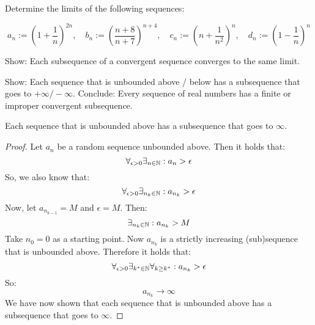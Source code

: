 \documentclass[week=4]{homework}
\date{\today}
\begin{document}
    \maketitle
    \thispagestyle{empty}
    \newpage
    \begin{questions}
		\let\firstquestion\question
		\renewcommand*{\question}{\vspace{7mm}\firstquestion}
        \firstquestion
        Determine the limits of the following sequences:
        
        \[
	        a_n := \left(1 + \frac{1}{n} \right)^{2n}, \quad b_n := \left(\frac{n+8}{n+7} \right)^{n+4}, \quad c_n := \left(n + \frac{1}{n^2} \right)^{n}, \quad d_n := \left(1 - \frac{1}{n} \right)^n
        \]
        
        \question 
        Show: Each subsequence of a convergent sequence converges to the same limit. 
        
        \question 
        Show: Each sequence that is unbounded above / below has a subsequence that goes to $+ \infty / - \infty$. Conclude: Every sequence of real numbers has a finite or improper convergent subsequence. 
        
        \begin{inlinetoprove}
        	Each sequence that is unbounded above has a subsequence that goes to $\infty$.
        \end{inlinetoprove}
        \begin{proof}
        	Let $a_n$ be a random sequence unbounded above. Then it holds that:
        	\[
	        	\forall_{\epsilon > 0} \exists_{n \in \naturals} : a_n > \epsilon
        	\]
	        So, we also know that:
	        \[
		        \forall_{\epsilon > 0} \exists_{n_k \in \naturals} : a_{n_{k}} > \epsilon
	        \]
	        Now, let $a_{n_{k-1}} = M$ and $\epsilon = M$. Then: 
	        \[
		        \exists_{n_k \in \mathbb{N}} : a_{n_{k}} > M
	        \]
	        Take $n_0 = 0$ as a starting point. Now $a_{n_k}$ is a strictly increasing (sub)sequence that is unbounded above. Therefore it holds that:
	        \[
		        \forall_{\epsilon > 0} \exists_{k^* \in \naturals} \forall_{k \ge k^*} : a_{n_k} > \epsilon
	        \]
	        So:
	        \[
		        a_{n_k} \to \infty 
	        \]
	        We have now shown that each sequence that is unbounded above has a subsequence that goes to $\infty$.
        \end{proof}
        

\end{questions}
\end{document}
